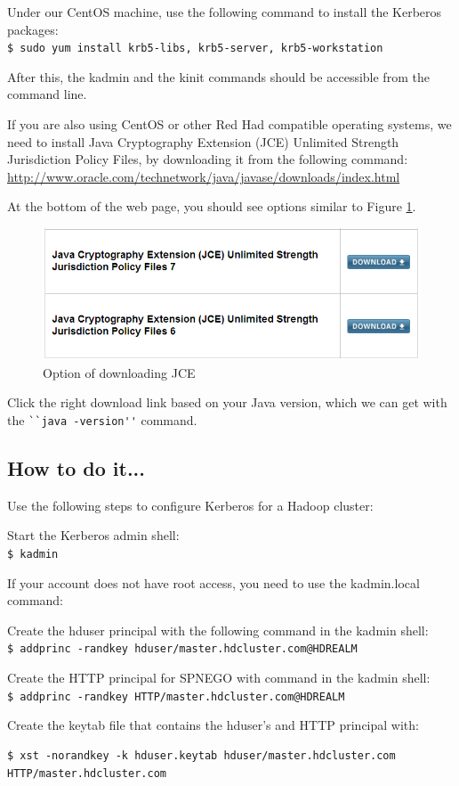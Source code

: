 Under our CentOS machine, use the following command to install the Kerberos packages: \\
\verb|$ sudo yum install krb5-libs, krb5-server, krb5-workstation|

After this, the kadmin and the kinit commands should be accessible from the command line.

If you are also using CentOS or other Red Had compatible operating systems, we need to install Java Cryptography Extension (JCE) Unlimited Strength Jurisdiction Policy Files, by downloading it from the following command: \url{http://www.oracle.com/technetwork/java/javase/downloads/index.html}

At the bottom of the web page, you should see options similar to Figure \ref{fig:jce}.
\begin{figure}[ht]
  \centering
  \includegraphics[width=.85\textwidth]{figs/5163os_05_01.png}
  \caption{Option of downloading JCE}\label{fig:jce}
\end{figure} 
Click the right download link based on your Java version, which we can get with the \verb|``java -version''| command.
\subsection*{How to do it...}
Use the following steps to configure Kerberos for a Hadoop cluster:

Start the Kerberos admin shell: \\
\verb|$ kadmin|

If your account does not have root access, you need to use the kadmin.local command:

Create the hduser principal with the following command in the kadmin shell: \\
\verb|$ addprinc -randkey hduser/master.hdcluster.com@HDREALM|

Create the HTTP principal for SPNEGO with command in the kadmin shell: \\
\verb|$ addprinc -randkey HTTP/master.hdcluster.com@HDREALM|

Create the keytab file that contains the hduser's and HTTP principal with: 
\lstset{style=bashstyle}
\begin{lstlisting}
$ xst -norandkey -k hduser.keytab hduser/master.hdcluster.com HTTP/master.hdcluster.com
\end{lstlisting}


